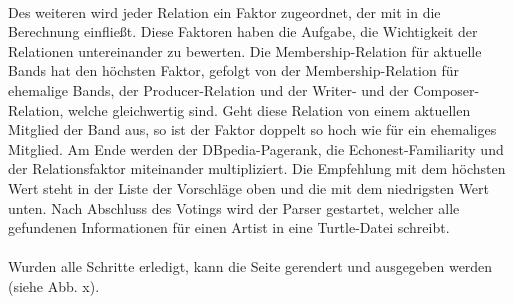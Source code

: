 \paragraph{} Des weiteren wird jeder Relation ein Faktor zugeordnet, der mit in die Berechnung einfließt. Diese Faktoren haben die Aufgabe, die Wichtigkeit der Relationen untereinander zu bewerten. Die Membership-Relation für aktuelle Bands hat den höchsten Faktor, gefolgt von der Membership-Relation für ehemalige Bands, der Producer-Relation und der Writer- und der Composer-Relation, welche gleichwertig sind. Geht diese Relation von einem aktuellen Mitglied der Band aus, so ist der Faktor doppelt so hoch wie für ein ehemaliges Mitglied. Am Ende werden der DBpedia-Pagerank, die Echonest-Familiarity und der Relationsfaktor miteinander multipliziert. Die Empfehlung mit dem höchsten Wert steht in der Liste der Vorschläge oben und die mit dem niedrigsten Wert unten.
Nach Abschluss des Votings wird der Parser gestartet, welcher alle gefundenen Informationen für einen Artist in eine Turtle-Datei schreibt. %

\paragraph{} Wurden alle Schritte erledigt, kann die Seite gerendert und ausgegeben werden (siehe Abb. x).


